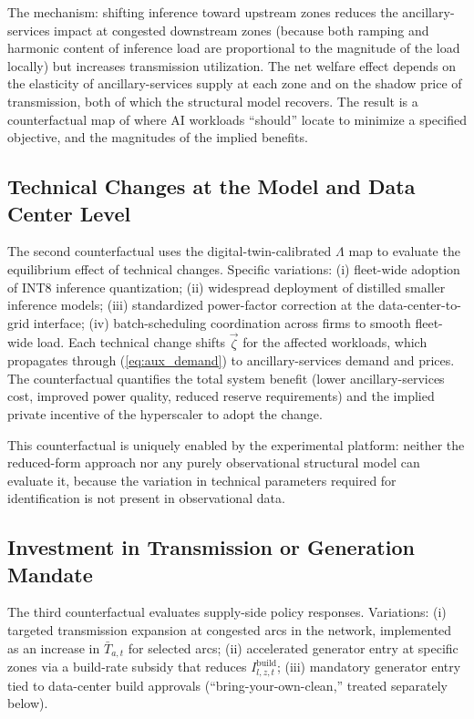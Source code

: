\documentclass[12pt,letterpaper]{article}
\begin{document}
The mechanism: shifting inference toward upstream zones reduces the
ancillary-services impact at congested downstream zones (because both
ramping and harmonic content of inference load are
proportional to the magnitude of the load locally) but increases
transmission utilization. The net welfare effect depends on the
elasticity of ancillary-services supply at each zone and on the
shadow price of transmission, both of which the structural model
recovers. The result is a counterfactual map of where AI workloads
``should'' locate to minimize a specified objective, and the magnitudes
of the implied benefits.

\subsection{Technical Changes at the Model and Data Center Level}

The second counterfactual uses the digital-twin-calibrated $\Lambda$ map
to evaluate the equilibrium effect of technical changes. Specific variations:
(i) fleet-wide adoption of INT8 inference quantization; (ii) widespread
deployment of distilled smaller inference models; (iii) standardized power-factor
correction at the data-center-to-grid interface; (iv) batch-scheduling
coordination across firms to smooth fleet-wide load. Each technical
change shifts $\vec\zeta$ for the affected workloads, which propagates
through (\ref{eq:aux_demand}) to ancillary-services demand and prices.
The counterfactual quantifies the total system benefit (lower
ancillary-services cost, improved power quality, reduced reserve
requirements) and the implied private incentive of the hyperscaler
to adopt the change.

This counterfactual is uniquely enabled by the experimental platform:
neither the reduced-form approach nor any purely observational structural
model can evaluate it, because the variation in technical parameters
required for identification is not present in observational data.

\subsection{Investment in Transmission or Generation Mandate}

The third counterfactual evaluates supply-side policy responses. Variations:
(i) targeted transmission expansion at congested arcs in the network,
implemented as an increase in $\bar T_{a,t}$ for selected arcs;
(ii) accelerated generator entry at specific zones via a build-rate
subsidy that reduces $I^{\text{build}}_{l,z,t}$; (iii) mandatory
generator entry tied to data-center build approvals (``bring-your-own-clean,''
treated separately below).
\end{document}
